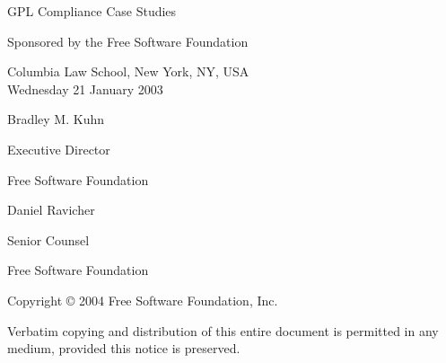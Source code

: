 \documentclass[12pt]{report}
\begin{document}
\begin{titlepage}


\begin{center}

\vspace{.5in}

{\Large {\sc GPL Compliance Case Studies} \\

\vspace{.7in}

Sponsored by the Free Software Foundation \\


\vspace{.3in}

Columbia Law School, New York, NY, USA \\
\vspace{.1in}
Wednesday 21 January 2003 
}

\vspace{.7in}

{\large
Bradley M. Kuhn

Executive Director

Free Software Foundation
}

\vspace{.3in}


{\large
Daniel Ravicher

Senior Counsel 

Free Software Foundation
}

\end{center}

\vfill

{\parindent 0in
Copyright \copyright{} 2004 \hspace{.2in} Free Software Foundation, Inc.

\vspace{.3in}

Verbatim copying and distribution of this entire document is permitted in
any medium, provided this notice is preserved.
}

\end{titlepage}

\pagestyle{plain}

\begin{abstract}


This one-day course presents the details of five different GPL compliance
cases handled by FSF's GPL Compliance Laboratory.  Each case offers unique
insights into problems that can arise when the terms of GPL are not
properly followed, and how diplomatic negotiation between the violator and
the copyright holder can yield positive results for both parties.

Attendees should have successfully completely the course, a ``Detailed
Study and Analysis of GPL and LGPL'', as the material from that course
forms the building blocks for this material.

The course is of most interest to lawyers who have clients or employers
that deal with Free Software on a regular basis.  However, technical
managers and executives whose businesses use or distribute Free Software
will also find the course very helpful.

\end{abstract}
\end{document}
